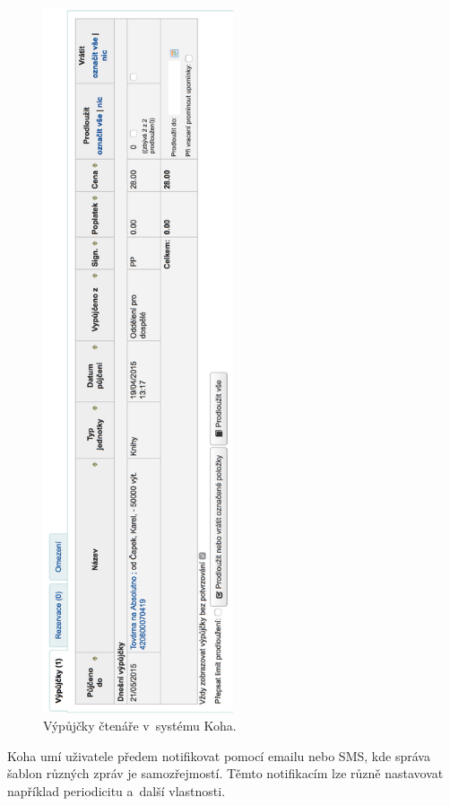 \documentclass[
	11pt, oneside, printed, final, palatino
	microtype,
	table,   %
	lof,     %
	lot     %
]{fithesis3}
\begin{document}
{\begin{figure}
    \centering
    \includegraphics[width=0.5\textwidth]{resources/vypujcky_left}
    \caption{Výpůjčky čtenáře v~systému Koha.}
    \label{vypujcky}
\end{figure}

Koha umí uživatele předem notifikovat pomocí emailu nebo SMS, kde správa šablon různých zpráv je samozřejmostí. Těmto notifikacím lze různě nastavovat například periodicitu a~další vlastnosti.

}
\end{document}
